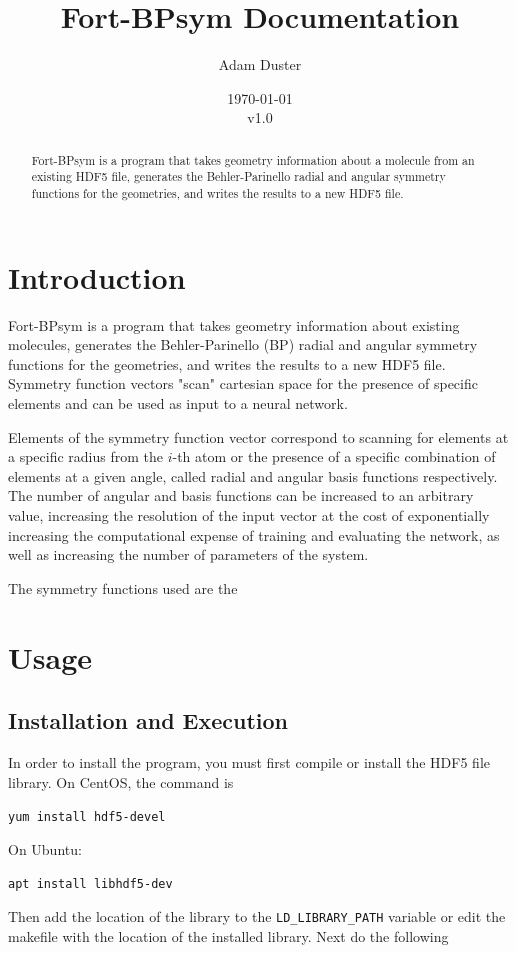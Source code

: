 \documentclass{article}
\begin{document}
\title{Fort-BPsym Documentation}
\author{Adam Duster}
\date{\today\\v1.0}
\maketitle
\begin{abstract}
	Fort-BPsym is a program that takes geometry information about a molecule from an existing HDF5 file, generates the Behler-Parinello radial and angular symmetry functions for the geometries, and writes the results to a new HDF5 file.
\end{abstract}
\tableofcontents
\section{Introduction}
	Fort-BPsym is a program that takes geometry information about existing molecules, generates the Behler-Parinello (BP) radial and angular symmetry functions for the geometries, and writes the results to a new HDF5 file. Symmetry function vectors "scan" cartesian space for the presence of specific elements and can be used as input to a neural network.
	
	Elements of the symmetry function vector correspond to scanning for elements at a specific radius from the $i$-th atom or the presence of a specific combination of elements at a given angle, called radial and angular basis functions respectively.
 The number of angular and basis functions can be increased to an arbitrary value, increasing the resolution of the input vector at the cost of exponentially increasing the computational expense of training and evaluating the network, as well as increasing the number of parameters of the system. 
 
	The symmetry functions used are the
\section{Usage}
\subsection{Installation and Execution}
In order to install the program, you must first compile or install the HDF5 file library. On CentOS, the command is 

\texttt{yum install hdf5-devel}

On Ubuntu:

\texttt{apt install libhdf5-dev}

Then add the location of the library to the \texttt{LD\_LIBRARY\_PATH} variable or edit the makefile with the location of the installed library. Next do the following
\end{document}
